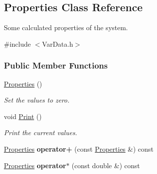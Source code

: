 \hypertarget{classProperties}{\subsection{\-Properties \-Class \-Reference}
\label{classProperties}
}


\-Some calculated properties of the system.  




{\ttfamily \#include $<$\-Var\-Data.\-h$>$}

\subsubsection*{\-Public \-Member \-Functions}
\begin{DoxyCompactItemize}
\item 
\hypertarget{classProperties_aa7321215b53f90ec4dc293e06ff79938}{\hyperlink{classProperties_aa7321215b53f90ec4dc293e06ff79938}{\-Properties} ()}\label{classProperties_aa7321215b53f90ec4dc293e06ff79938}

\begin{DoxyCompactList}\small\item\em \-Set the values to zero. \end{DoxyCompactList}\item 
\hypertarget{classProperties_a9dcac18006ce057b8d78c847174c1362}{void \hyperlink{classProperties_a9dcac18006ce057b8d78c847174c1362}{\-Print} ()}\label{classProperties_a9dcac18006ce057b8d78c847174c1362}

\begin{DoxyCompactList}\small\item\em \-Print the current values. \end{DoxyCompactList}\item 
\hypertarget{classProperties_a3461e5fc61bb0eb33b089e2c696d2692}{\hyperlink{classProperties}{\-Properties} {\bfseries operator+} (const \hyperlink{classProperties}{\-Properties} \&) const }\label{classProperties_a3461e5fc61bb0eb33b089e2c696d2692}

\item 
\hypertarget{classProperties_afa73aff41e3679c9dfc3ba858a1450ff}{\hyperlink{classProperties}{\-Properties} {\bfseries operator$\ast$} (const double \&) const }\label{classProperties_afa73aff41e3679c9dfc3ba858a1450ff}

\end{DoxyCompactItemize}

